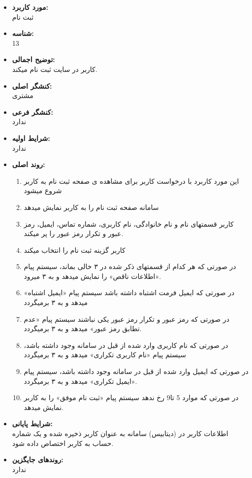 \documentclass{article}
\begin{document}
\noindent\makebox[\linewidth]{\rule{\paperwidth}{0.4pt}}

\begin{itemize}
\item \textbf{مورد کاربرد:}\\
ثبت نام
\item \textbf{شناسه:}\\
13
\item \textbf{توضیح اجمالی:}\\
کاربر در سایت ثبت نام میکند.
\item \textbf{کنشگر اصلی:}\\
مشتری
\item \textbf{کنشگر فرعی:}\\
ندارد
\item \textbf{شرایط اولیه:}\\
ندارد
\item \textbf{روند اصلی:}\\
\begin{enumerate}
\item  این مورد کاربرد با درخواست کاربر برای مشاهده ی صفحه ثبت نام به کاربر شروع میشود
\item سامانه صفحه ثبت نام را به کاربر نمایش میدهد
\item کاربر قسمتهای نام و نام خانوادگی، نام کاربری، شماره تماس، ایمیل، رمز عبور و تکرار رمز عبور را پر میکند.
\item کاربر گزینه ثبت نام را انتخاب میکند
\item در صورتی که هر کدام از قسمتهای ذکر شده در ۳ خالی بماند، سیستم پیام «اطلاعات ناقص» را نمایش میدهد و به ۳ میرود.
\item  در صورتی که ایمیل فرمت اشتباه داشته باشد سیستم پیام «ایمیل اشتباه» میدهد و به ۳ برمیگردد
\item در صورتی که رمز عبور و تکرار رمز عبور یکی نباشند سیستم پیام «عدم تطابق رمز عبور» میدهد و به ۳ برمیگردد.
\item در صورتی که نام کاربری وارد شده از قبل در سامانه وجود داشته باشد، سیستم پیام «نام کاربری تکراری» میدهد و به ۳ برمیگردد
\item در صورتی که ایمیل وارد شده از قبل در سامانه وجود داشته باشد، سیستم پیام «ایمیل تکراری» میدهد و به ۳ برمیگردد.
\item در صورتی که موارد 5 تا9 رخ ندهد سیستم پیام «ثبت نام موفق» را به کاربر نمایش میدهد.
\end{enumerate}
\item \textbf{شرایط پایانی:}\\ 
اطلاعات کاربر در (دیتابیس) سامانه به عنوان کاربر ذخیره شده و یک شماره حساب به کاربر اختصاص داده شود.
\item \textbf{روندهای جایگزین:}\\
ندارد
\end{itemize}
\noindent\makebox[\linewidth]{\rule{\paperwidth}{0.4pt}}
\end{document}
